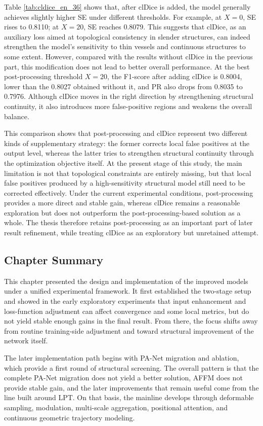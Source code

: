 \documentclass[a4paper,11pt]{article}
\begin{document}
Table \ref{tab:cldice_en_36} shows that, after clDice is added, the model generally achieves slightly higher SE under different thresholds. For example, at \(X=0\), SE rises to 0.8110; at \(X=20\), SE reaches 0.8079. This suggests that clDice, as an auxiliary loss aimed at topological consistency in slender structures, can indeed strengthen the model's sensitivity to thin vessels and continuous structures to some extent. However, compared with the results without clDice in the previous part, this modification does not lead to better overall performance. At the best post-processing threshold \(X=20\), the F1-score after adding clDice is 0.8004, lower than the 0.8027 obtained without it, and PR also drops from 0.8035 to 0.7976. Although clDice moves in the right direction by strengthening structural continuity, it also introduces more false-positive regions and weakens the overall balance.

This comparison shows that post-processing and clDice represent two different kinds of supplementary strategy: the former corrects local false positives at the output level, whereas the latter tries to strengthen structural continuity through the optimization objective itself. At the present stage of this study, the main limitation is not that topological constraints are entirely missing, but that local false positives produced by a high-sensitivity structural model still need to be corrected effectively. Under the current experimental conditions, post-processing provides a more direct and stable gain, whereas clDice remains a reasonable exploration but does not outperform the post-processing-based solution as a whole. The thesis therefore retains post-processing as an important part of later result refinement, while treating clDice as an exploratory but unretained attempt.

\subsection{Chapter Summary}
This chapter presented the design and implementation of the improved models under a unified experimental framework. It first established the two-stage setup and showed in the early exploratory experiments that input enhancement and loss-function adjustment can affect convergence and some local metrics, but do not yield stable enough gains in the final result. From there, the focus shifts away from routine training-side adjustment and toward structural improvement of the network itself.

The later implementation path begins with PA-Net migration and ablation, which provide a first round of structural screening. The overall pattern is that the complete PA-Net migration does not yield a better solution, AFFM does not provide stable gain, and the later improvements that remain useful come from the line built around LPT. On that basis, the mainline develops through deformable sampling, modulation, multi-scale aggregation, positional attention, and continuous geometric trajectory modeling.
\end{document}
